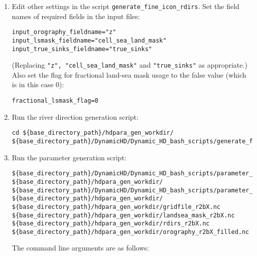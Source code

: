 \documentclass{article}
\begin{document}
\begin{enumerate}
\begin{lstlisting}[style=bash_input,breaklines=true]
icon_data_dir=${base_directory_path}/hdpara_gen_workdir/
cpp_icon_tool_dir=${base_directory_path}/DynamicHD/Dynamic_HD_Cpp_Code/Release
grid_file=${icon_data_dir}/gridfile_r2bX.nc
orography_file=${icon_data_dir}/orography_r2bX.nc
lsmask_file=${icon_data_dir}/landsea_mask_r2bX.nc
true_sinks_file=${icon_data_dir}/true_sinks_r2bX.nc
output_orography_file=${icon_data_dir}/orography_r2bX_filled.nc
next_cell_index_file=${icon_data_dir}/rdirs_r2bX.nc
catchments_file=${icon_data_dir}/catchments_r2bX.nc
 \end{lstlisting}
 \item Edit other settings in the script \lstinline[style=bash_input]{generate_fine_icon_rdirs}. Set the field names of required fields in the input files:
\begin{lstlisting}[style=bash_input,breaklines=true]
input_orography_fieldname="z"
input_lsmask_fieldname="cell_sea_land_mask"
input_true_sinks_fieldname="true_sinks"
\end{lstlisting}
(Replacing  \lstinline[style=bash_input]{"z", "cell_sea_land_mask"} and  \lstinline[style=bash_input]{"true_sinks"} as appropriate.) Also set the flag for fractional land-sea mask usage to the false value (which is in this case 0):
\begin{lstlisting}[style=bash_input,breaklines=true]
fractional_lsmask_flag=0 
\end{lstlisting}
\item Run the river direction generation script:
\begin{lstlisting}[style=bash_input,breaklines=true]
cd ${base_directory_path}/hdpara_gen_workdir/
${base_directory_path}/DynamicHD/Dynamic_HD_bash_scripts/generate_fine_icon_rdirs
\end{lstlisting}
\item Run the parameter generation script:
\begin{lstlisting}[style=bash_input,breaklines=true]
${base_directory_path}/DynamicHD/Dynamic_HD_bash_scripts/parameter_generation_scripts/generate_icon_hd_file_driver.sh ${base_directory_path}/hdpara_gen_workdir/ ${base_directory_path}/DynamicHD/Dynamic_HD_bash_scripts/parameter_generation_scripts/fortran ${base_directory_path}/hdpara_gen_workdir/ ${base_directory_path}/hdpara_gen_workdir/gridfile_r2bX.nc ${base_directory_path}/hdpara_gen_workdir/landsea_mask_r2bX.nc ${base_directory_path}/hdpara_gen_workdir/rdirs_r2bX.nc ${base_directory_path}/hdpara_gen_workdir/orography_r2bX_filled.nc
\end{lstlisting} 
The command line arguments are as follows:

\end{enumerate}
\end{document}
